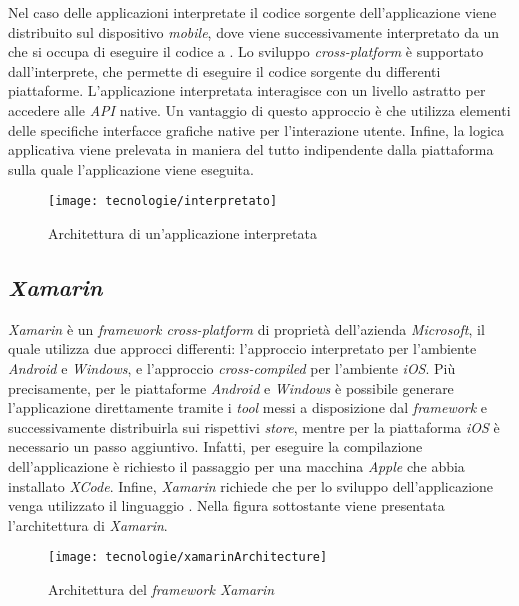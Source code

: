 \newpage

Nel caso delle applicazioni interpretate il codice sorgente dell'applicazione viene distribuito sul dispositivo \textit{mobile}, dove viene successivamente interpretato da un  che si occupa di eseguire il codice a . Lo sviluppo \textit{cross-platform}  è supportato dall'interprete, che permette di eseguire il codice sorgente du differenti piattaforme. L'applicazione interpretata interagisce con un livello astratto per accedere alle \textit{API} native. Un vantaggio di questo approccio è che utilizza elementi delle specifiche interfacce grafiche native per l'interazione utente. Infine, la logica applicativa viene prelevata in maniera del tutto indipendente dalla piattaforma sulla quale l'applicazione viene eseguita.

\begin{figure}[!h] 
    \centering 
    \texttt{[image: tecnologie/interpretato]} 
    \caption{Architettura di un'applicazione interpretata}
\end{figure}

\newpage

\subsection{\textit{Xamarin}}

\textit{Xamarin} è un \textit{framework cross-platform} di proprietà dell'azienda \textit{Microsoft}, il quale utilizza due approcci differenti: l'approccio interpretato per l'ambiente \textit{Android} e \textit{Windows}, e l'approccio \textit{cross-compiled} per l'ambiente \textit{iOS}. Più precisamente, per le piattaforme \textit{Android} e \textit{Windows} è possibile generare l'applicazione direttamente tramite i \textit{tool} messi a disposizione dal \textit{framework} e successivamente distribuirla sui rispettivi \textit{store}, mentre per la piattaforma \textit{iOS} è necessario un passo aggiuntivo. Infatti, per eseguire la compilazione dell'applicazione è richiesto il passaggio per una macchina \textit{Apple} che abbia installato \textit{XCode}. Infine, \textit{Xamarin} richiede che per lo sviluppo dell'applicazione venga utilizzato il linguaggio . Nella figura sottostante viene presentata l'architettura di \textit{Xamarin}.

\begin{figure}[!h] 
    \centering 
    \texttt{[image: tecnologie/xamarinArchitecture]} 
    \caption{Architettura del \textit{framework Xamarin}}
\end{figure}

